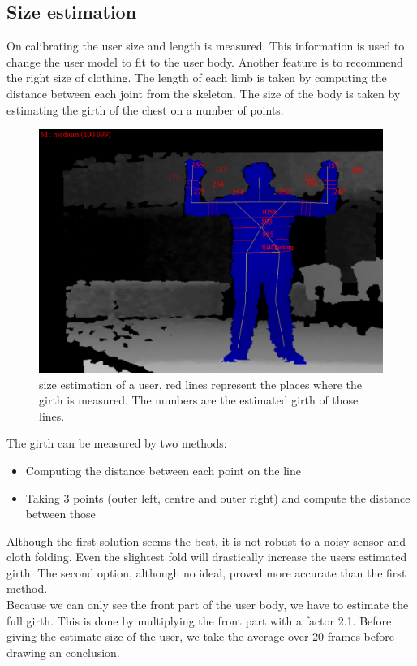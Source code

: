 \documentclass[a4paper]{article}
\begin{document}
\subsection{Size estimation}
\label{sec:size_estimation}
On calibrating the user size and length is measured. This information is used to change the user model to fit to the user body. Another feature is to recommend the right size of clothing. The length of each limb is taken by computing the distance between each joint from the skeleton.
The size of the body is taken by estimating the girth of the chest on a number of points.
\begin{figure}[htp]
\centering
\includegraphics[scale=0.3]{size_estimation.png} 
\caption{size estimation of a user, red lines represent the places where the girth is measured. The numbers are the estimated girth of those lines.}
\label{fig:size_estimation}
\end{figure}
The girth can be measured by two methods:
\begin{itemize}
\item Computing the distance between each point on the line
\item Taking 3 points (outer left, centre and outer right) and compute the distance between those
\end{itemize}
Although the first solution seems the best, it is not robust to a noisy sensor and cloth folding. Even the slightest fold will drastically increase the users estimated girth.
The second option, although no ideal, proved more accurate than the first method.
\\
Because we can only see the front part of the user body, we have to estimate the full girth. This is done by multiplying the front part with a factor 2.1.
Before giving the estimate size of the user, we take the average over 20 frames before drawing an conclusion.
\end{document}
